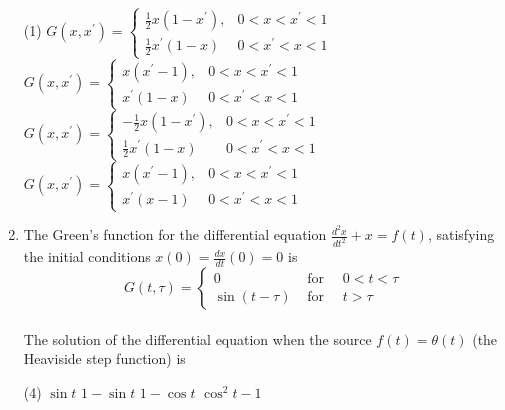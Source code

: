 \begin{enumerate}[label=\color{ocre}\textbf{\arabic*.}]
	{}
	\begin{tasks}(1)
		\task[\textbf{A.}] $G\left(x, x^{\prime}\right)=\left\{\begin{array}{ll}\frac{1}{2} x\left(1-x^{\prime}\right), & 0<x<x^{\prime}<1 \\ \frac{1}{2} x^{\prime}(1-x) & 0<x^{\prime}<x<1\end{array}\right.$
		\task[\textbf{B.}] $G\left(x, x^{\prime}\right)=\left\{\begin{array}{ll}x\left(x^{\prime}-1\right), & 0<x<x^{\prime}<1 \\ x^{\prime}(1-x) & 0<x^{\prime}<x<1\end{array}\right.$
		\task[\textbf{C.}] $G\left(x, x^{\prime}\right)=\left\{\begin{array}{ll}-\frac{1}{2} x\left(1-x^{\prime}\right), & 0<x<x^{\prime}<1 \\ \frac{1}{2} x^{\prime}(1-x) & 0<x^{\prime}<x<1\end{array}\right.$
		\task[\textbf{D.}]  $G\left(x, x^{\prime}\right)=\left\{\begin{array}{ll}x\left(x^{\prime}-1\right), & 0<x<x^{\prime}<1 \\ x^{\prime}(x-1) & 0<x^{\prime}<x<1\end{array}\right.$
	\end{tasks}
	\item  The Green's function for the differential equation $\frac{d^{2} x}{d t^{2}}+x=f(t)$, satisfying the initial conditions $x(0)=\frac{d x}{d t}(0)=0$ is\\
	$$G(t, \tau)=\left\{\begin{array}{ll}0 & \text { for } \quad 0<t<\tau \\ \sin (t-\tau) & \text { for } \quad t>\tau\end{array}\right.$$\\
	The solution of the differential equation when the source $f(t)=\theta(t)$ (the Heaviside step function) is
	{}
	\begin{tasks}(4)
		\task[\textbf{A.}] $\sin t$
		\task[\textbf{B.}] $1-\sin t$
		\task[\textbf{C.}] $1-\cos t$
		\task[\textbf{D.}] $\cos ^{2} t-1$
	\end{tasks}
\end{enumerate}
\setlength\arrayrulewidth{1pt}
